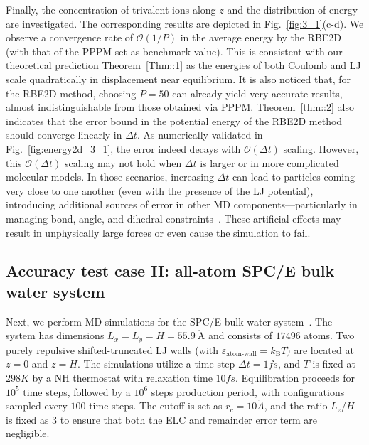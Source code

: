 Finally, the concentration of trivalent ions along $z$ and the distribution of energy are investigated.
The corresponding results are depicted in Fig.~\ref{fig:3_1}(c-d). 
We observe a convergence rate of $\mathcal{O}(1/P)$ in the average energy by the RBE2D (with that of the PPPM set as benchmark value). 
This is consistent with our theoretical prediction Theorem~\ref{Thm::1} as the energies of both Coulomb and LJ scale quadratically in displacement near equilibrium.
It is also noticed that, for the RBE2D method, choosing $P=50$ can already yield very accurate results, almost indistinguishable from those obtained via PPPM. 
 {Theorem~\ref{thm::2} also indicates that the error bound in the potential energy of the RBE2D method should converge linearly in $\Delta t$. 
 As numerically validated in Fig.~\ref{fig:energy2d_3_1}, the error indeed decays with $\mathcal{O}(\Delta t)$ scaling. However, this $\mathcal{O}(\Delta t)$ scaling may not hold when $\Delta t$ is larger or in more complicated molecular models. 
 In those scenarios, increasing \(\Delta t\) can lead to particles coming very close to one another (even with the presence of the LJ potential), introducing additional sources of error in other MD components—particularly in managing bond, angle, and dihedral constraints~\cite{frenkel2023understanding}. These artificial effects may result in unphysically large forces or even cause the simulation to fail.}

\subsection{Accuracy test case II: all-atom SPC/E bulk water system}
\label{sec::waterhomo}

Next, we perform MD simulations for the SPC/E bulk water system~\cite{berendsen1987missing}. 
The system has dimensions $L_x=L_y=H=55.9~\mathring{\text{A}}$ and consists of $17496$ atoms. 
Two purely repulsive shifted-truncated LJ walls (with $\varepsilon_{\text{atom-wall}}= k_{\text{B}}T)$ are located at $z=0$ and $z=H$. 
The simulations utilize a time step $\Delta t=1fs$, and $T$ is fixed at $298K$ by a NH thermostat with relaxation time $10fs$. 
Equilibration proceeds for $10^5$ time steps, followed by a $10^6$ steps production period, with configurations sampled every $100$ time steps. 
The cutoff is set as $r_c=10\mathring{A}$, and the ratio $L_z/H$ is fixed as $3$ to ensure that both the ELC and remainder error term are negligible.


